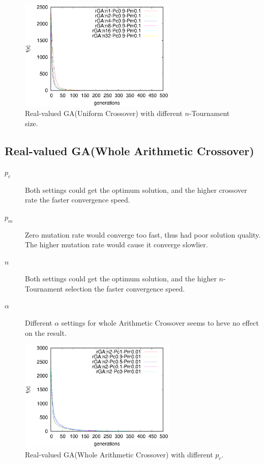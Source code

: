 ﻿\documentclass[conference]{IEEEtran}
\begin{document}
\begin{CJK}{UTF8}{bsmi}
\begin{figure}[htbp]
\centerline{\includegraphics[width=7.5cm]{fig/rGA/change_n_uni.eps}}
\caption{Real-valued GA(Uniform Crossover) with different $n$-Tournament size.}
\label{fig}
\end{figure}

\subsection{Real-valued GA(Whole Arithmetic Crossover)}
\begin{description}
\item [$p_{c}$] Both settings could get the optimum solution, and the higher crossover rate the faster convergence speed.
\item [$p_{m}$] Zero mutation rate would converge too fast, thus had poor solution quality. The higher mutation rate would cause it converge slowlier.
\item [$n$] Both settings could get the optimum solution, and the higher $n$-Tournament selection the faster convergence speed.
\item [$\alpha$] Different $\alpha$ settings for whole Arithmetic Crossover seems to heve no effect on the result. 
\end{description}

\begin{figure}[htbp]
\centerline{\includegraphics[width=7.5cm]{fig/rGA/change_pc_whole.eps}}
\caption{Real-valued GA(Whole Arithmetic Crossover) with different $p_{c}$.}
\label{fig}
\end{figure}


\end{CJK}
\end{document}
